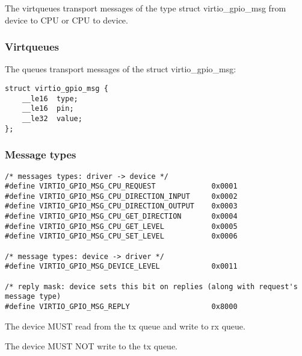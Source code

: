 The virtqueues transport messages of the type struct virtio_gpio_msg from device to CPU or CPU to device.

\subsubsection{Virtqueues}\label{sec:Device Types / General Purpose IO / Virtqueues / Message format}

The queues transport messages of the struct virtio_gpio_msg:

\begin{lstlisting}
struct virtio_gpio_msg {
    __le16  type;
    __le16  pin;
    __le32  value;
};
\end{lstlisting}

\subsubsection{Message types}\label{sec:Device Types / General Purpose IO / Virtqueues / Message types}

\begin{lstlisting}
/* messages types: driver -> device */
#define VIRTIO_GPIO_MSG_CPU_REQUEST             0x0001
#define VIRTIO_GPIO_MSG_CPU_DIRECTION_INPUT     0x0002
#define VIRTIO_GPIO_MSG_CPU_DIRECTION_OUTPUT    0x0003
#define VIRTIO_GPIO_MSG_CPU_GET_DIRECTION       0x0004
#define VIRTIO_GPIO_MSG_CPU_GET_LEVEL           0x0005
#define VIRTIO_GPIO_MSG_CPU_SET_LEVEL           0x0006

/* message types: device -> driver */
#define VIRTIO_GPIO_MSG_DEVICE_LEVEL            0x0011

/* reply mask: device sets this bit on replies (along with request's message type)
#define VIRTIO_GPIO_MSG_REPLY                   0x8000
\end{lstlisting}


The device MUST read from the tx queue and write to rx queue.

The device MUST NOT write to the tx queue.


